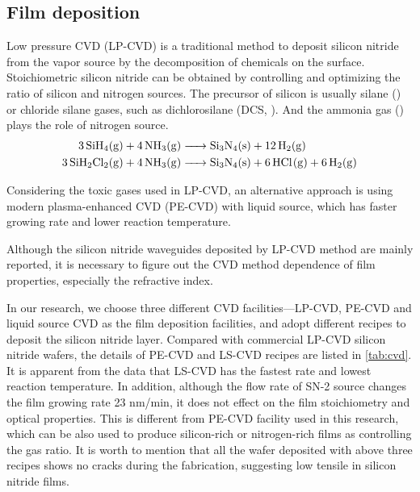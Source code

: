 \subsection{Film deposition}

Low pressure CVD (LP-CVD) is a traditional method to deposit silicon nitride from the vapor source by the decomposition of chemicals on the surface.  
Stoichiometric silicon nitride can be obtained by controlling and optimizing the ratio of silicon and nitrogen sources. 
The precursor of silicon is usually silane () or chloride silane gases, such as dichlorosilane (DCS, ). And the ammonia gas () plays the role of nitrogen source. 
\begin{align*}
    \ce{3SiH4(g) + 4NH3(g) &-> Si3N4(s) + 12H2(g)} \\
    \ce{3SiH2Cl2(g) + 4NH3(g) &-> Si3N4(s) + 6HCl(g) + 6H2(g)}
\end{align*}

Considering the toxic gases used in LP-CVD, an alternative approach is using modern plasma-enhanced CVD (PE-CVD) with liquid source, which has faster growing rate and lower reaction temperature.

Although the silicon nitride waveguides deposited by LP-CVD method are mainly reported, it is necessary to figure out the CVD method dependence of film properties, especially the refractive index. 


In our research, we choose three different CVD facilities---LP-CVD, PE-CVD and liquid source CVD as the film deposition facilities, and adopt different recipes to deposit the silicon nitride layer. Compared with commercial LP-CVD silicon nitride wafers,
the details of PE-CVD and LS-CVD recipes are listed in \autoref{tab:cvd}. It is apparent from the data that LS-CVD has the fastest rate and lowest reaction temperature. In addition, although the flow rate of SN-2 source changes the film growing rate 23 nm/min, it does not effect on the film stoichiometry and optical properties. This is different from PE-CVD facility used in this research, which can be also used to produce silicon-rich or nitrogen-rich films as controlling the gas ratio.
It is worth to mention that all the wafer deposited with above three recipes shows no cracks during the fabrication, suggesting low tensile in silicon nitride films.

